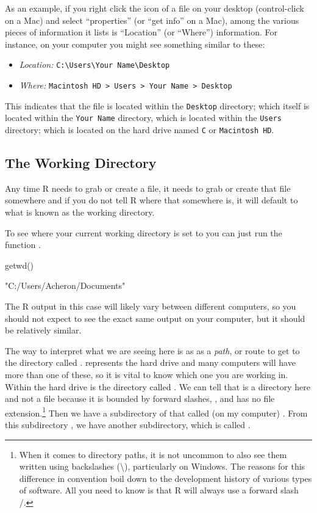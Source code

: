 As an example, if you right click the icon of a file on your desktop (control-click on a Mac) and select ``properties'' (or ``get info'' on a Mac), among the various pieces of information it lists is ``Location'' (or ``Where'') information.  For instance, on your computer you might see something similar to these:

\begin{itemize}
    \item \textit{Location:} \texttt{C:\textbackslash Users\textbackslash Your Name\textbackslash Desktop}
    \item \textit{Where:} \texttt{Macintosh HD > Users > Your Name > Desktop}
\end{itemize}

\noindent This indicates that the file is located within the \texttt{Desktop} directory; which itself is located within the \texttt{Your Name} directory, which is located within the \texttt{Users} directory; which is located on the hard drive named \texttt{C} or \texttt{Macintosh HD}.

\subsection{The Working Directory}

Any time R needs to grab or create a file, it needs to grab or create that file somewhere and if you do not tell R where that somewhere is, it will default to what is known as the \gls{working directory}.

To see where your current working directory is set to you can just run the function .

\begin{inR}
getwd()
\end{inR}

\begin{outR}
[1] "C:/Users/Acheron/Documents"
\end{outR}

\noindent The R output in this case will likely vary between different computers, so you should not expect to see the exact same output on your computer, but it should be relatively similar.

The way to interpret what we are seeing here is as as a \textit{path}, or route to get to the directory called .  represents the hard drive and many computers will have more than one of these, so it is vital to know which one you are working in. Within the hard drive is the directory called . We can tell that  is a directory here and not a file because it is bounded by forward slashes, \R{/}, and has no file extension.\footnote{When it comes to directory paths, it is not uncommon to also see them written using backslashes (\textbackslash), particularly on Windows. The reasons for this difference in convention boil down to the development history of various types of software. All you need to know is that R will always use a forward slash /.} Then we have a subdirectory of that called (on my computer) .  From this subdirectory , we have another subdirectory, which is called .

